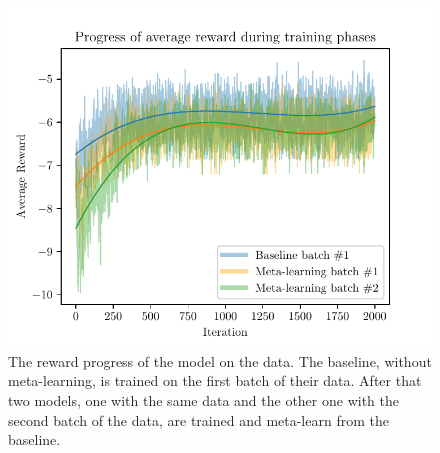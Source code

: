 \begin{figure}[htp!]
    \centering
    \includegraphics[width=.7\textwidth]{./fig/mrlco-reward.pdf}
    \caption{The reward progress of the \mrlco model on the \mrlco data. The
    baseline, without meta-learning, is trained on the first batch of their
    data. After that two models, one with the same data and the other one with
    the second batch of the data, are trained and meta-learn from the
    baseline.}
    \label{mrlco-reward}
\end{figure}
